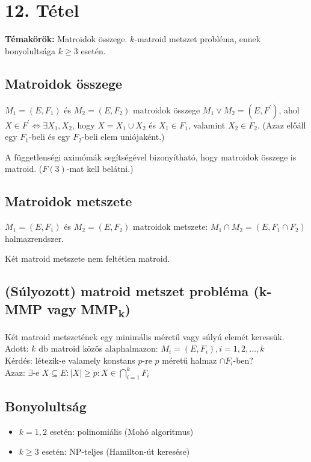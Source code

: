 
\setcounter{chapter}{12}
\chapter*{12. Tétel}

\textbf{Témakörök:} Matroidok összege. $k$-matroid metszet probléma, ennek bonyolultsága $k\geq3$ esetén.

\noindent\hrulefill

\section*{Matroidok összege}
$M_{1}=(E,F_{1})$ és $M_{2}=(E,F_{2})$ matroidok összege $M_{1}\vee M_{2}=(E,F^{'})$, ahol $X\in F^{'}\Leftrightarrow\exists X_{1},X_{2}$, hogy $X=X_{1}\cup X_{2}$ és $X_{1}\in F_{1}$, valamint $X_{2}\in F_{2}$. (Azaz előáll egy $F_{1}$-beli és egy $F_{2}$-beli elem uniójaként.)

\begin{theo} A függetlenségi aximómák segítségével bizonyítható, hogy matroidok összege is matroid. ($F(3)$-mat kell belátni.) \end{theo}

\section*{Matroidok metszete}
$M_{1}=(E,F_{1})$ és $M_{2}=(E,F_{2})$ matroidok metszete: $M_{1}\cap M_{2}=(E,F_{1}\cap F_{2})$ halmazrendszer.

\begin{theo} Két matroid metszete nem feltétlen matroid. \end{theo}

\section*{(Súlyozott) matroid metszet probléma (k-MMP vagy MMP\textsubscript{k})}
Két matroid metszetének egy minimális méretű vagy súlyú elemét keressük.\\
Adott: $k$ db matroid közös alaphalmazon: $M_{i}=(E,F_{i}), i=1,2,\ldots ,k$\\
Kérdés: létezik-e valamely konstans $p$-re $p$ méretű halmaz $\cap F_{i}$-ben?\\
Azaz: $\exists$-e $X\subseteq E: |X|\geq p: X\in \bigcap\limits_{i=1}^{k}F_{i}$

\section*{Bonyolultság}
\begin{itemize}
	\item $k=1,2$ esetén: polinomiális (Mohó algoritmus)
	\item $k\geq 3$ esetén: NP-teljes (Hamilton-út keresése)
\end{itemize}
